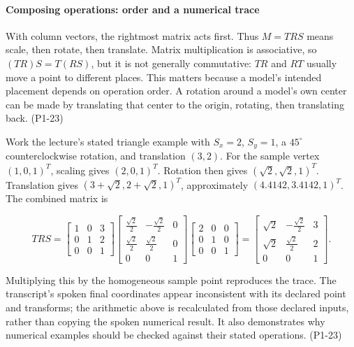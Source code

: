 \paragraph{Composing operations: order and a numerical trace}\label{03-visual-computing-i-ch001-composing-operations-order-and-a-numerical-trace}

\hypertarget{03-visual-computing-i-ch001-composing-operations-order-and-a-numerical-trace}{}

With column vectors, the rightmost matrix acts first. Thus \(M=TRS\) means scale, then rotate, then translate. Matrix multiplication is associative, so \((TR)S=T(RS)\), but it is not generally commutative: \(TR\) and \(RT\) usually move a point to different places. This matters because a model's intended placement depends on operation order. A rotation around a model's own center can be made by translating that center to the origin, rotating, then translating back. (P1-23)

Work the lecture's stated triangle example with \(S_x=2\), \(S_y=1\), a \(45^\circ\) counterclockwise rotation, and translation \((3,2)\). For the sample vertex \((1,0,1)^T\), scaling gives \((2,0,1)^T\). Rotation then gives \((\sqrt2,\sqrt2,1)^T\). Translation gives \((3+\sqrt2,2+\sqrt2,1)^T\), approximately \((4.4142,3.4142,1)^T\). The combined matrix is

\[
TRS=\begin{bmatrix}1&0&3\\0&1&2\\0&0&1\end{bmatrix}
\begin{bmatrix}\frac{\sqrt2}{2}&-\frac{\sqrt2}{2}&0\\\frac{\sqrt2}{2}&\frac{\sqrt2}{2}&0\\0&0&1\end{bmatrix}
\begin{bmatrix}2&0&0\\0&1&0\\0&0&1\end{bmatrix}
=\begin{bmatrix}\sqrt2&-\frac{\sqrt2}{2}&3\\\sqrt2&\frac{\sqrt2}{2}&2\\0&0&1\end{bmatrix}.
\]

Multiplying this by the homogeneous sample point reproduces the trace. The transcript's spoken final coordinates appear inconsistent with its declared point and transforms; the arithmetic above is recalculated from those declared inputs, rather than copying the spoken numerical result. It also demonstrates why numerical examples should be checked against their stated operations. (P1-23)

